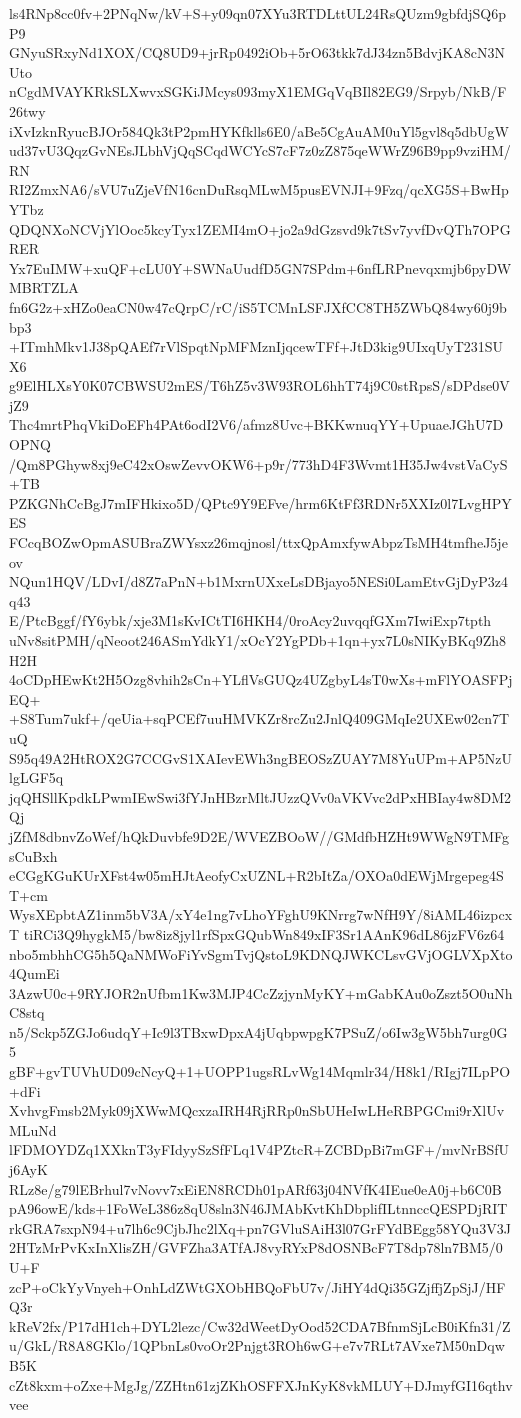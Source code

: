 ls4RNp8cc0fv+2PNqNw/kV+S+y09qn07XYu3RTDLttUL24RsQUzm9gbfdjSQ6pP9
GNyuSRxyNd1XOX/CQ8UD9+jrRp0492iOb+5rO63tkk7dJ34zn5BdvjKA8cN3NUto
nCgdMVAYKRkSLXwvxSGKiJMcys093myX1EMGqVqBIl82EG9/Srpyb/NkB/F26twy
iXvIzknRyucBJOr584Qk3tP2pmHYKfklls6E0/aBe5CgAuAM0uYl5gvl8q5dbUgW
ud37vU3QqzGvNEsJLbhVjQqSCqdWCYcS7cF7z0zZ875qeWWrZ96B9pp9vziHM/RN
RI2ZmxNA6/sVU7uZjeVfN16cnDuRsqMLwM5pusEVNJI+9Fzq/qcXG5S+BwHpYTbz
QDQNXoNCVjYlOoc5kcyTyx1ZEMI4mO+jo2a9dGzsvd9k7tSv7yvfDvQTh7OPGRER
Yx7EuIMW+xuQF+cLU0Y+SWNaUudfD5GN7SPdm+6nfLRPnevqxmjb6pyDWMBRTZLA
fn6G2z+xHZo0eaCN0w47cQrpC/rC/iS5TCMnLSFJXfCC8TH5ZWbQ84wy60j9bbp3
+ITmhMkv1J38pQAEf7rVlSpqtNpMFMznIjqcewTFf+JtD3kig9UIxqUyT231SUX6
g9ElHLXsY0K07CBWSU2mES/T6hZ5v3W93ROL6hhT74j9C0stRpsS/sDPdse0VjZ9
Thc4mrtPhqVkiDoEFh4PAt6odI2V6/afmz8Uvc+BKKwnuqYY+UpuaeJGhU7DOPNQ
/Qm8PGhyw8xj9eC42xOswZevvOKW6+p9r/773hD4F3Wvmt1H35Jw4vstVaCyS+TB
PZKGNhCcBgJ7mIFHkixo5D/QPtc9Y9EFve/hrm6KtFf3RDNr5XXIz0l7LvgHPYES
FCcqBOZwOpmASUBraZWYsxz26mqjnosl/ttxQpAmxfywAbpzTsMH4tmfheJ5jeov
NQun1HQV/LDvI/d8Z7aPnN+b1MxrnUXxeLsDBjayo5NESi0LamEtvGjDyP3z4q43
E/PtcBggf/fY6ybk/xje3M1sKvICtTI6HKH4/0roAcy2uvqqfGXm7IwiExp7tpth
uNv8sitPMH/qNeoot246ASmYdkY1/xOcY2YgPDb+1qn+yx7L0sNIKyBKq9Zh8H2H
4oCDpHEwKt2H5Ozg8vhih2sCn+YLflVsGUQz4UZgbyL4sT0wXs+mFlYOASFPjEQ+
+S8Tum7ukf+/qeUia+sqPCEf7uuHMVKZr8rcZu2JnlQ409GMqIe2UXEw02cn7TuQ
S95q49A2HtROX2G7CCGvS1XAIevEWh3ngBEOSzZUAY7M8YuUPm+AP5NzUlgLGF5q
jqQHSllKpdkLPwmIEwSwi3fYJnHBzrMltJUzzQVv0aVKVvc2dPxHBIay4w8DM2Qj
jZfM8dbnvZoWef/hQkDuvbfe9D2E/WVEZBOoW//GMdfbHZHt9WWgN9TMFgsCuBxh
eCGgKGuKUrXFst4w05mHJtAeofyCxUZNL+R2bItZa/OXOa0dEWjMrgepeg4ST+cm
WysXEpbtAZ1inm5bV3A/xY4e1ng7vLhoYFghU9KNrrg7wNfH9Y/8iAML46izpcxT
tiRCi3Q9hygkM5/bw8iz8jyl1rfSpxGQubWn849xIF3Sr1AAnK96dL86jzFV6z64
nbo5mbhhCG5h5QaNMWoFiYvSgmTvjQstoL9KDNQJWKCLsvGVjOGLVXpXto4QumEi
3AzwU0c+9RYJOR2nUfbm1Kw3MJP4CcZzjynMyKY+mGabKAu0oZszt5O0uNhC8stq
n5/Sckp5ZGJo6udqY+Ic9l3TBxwDpxA4jUqbpwpgK7PSuZ/o6Iw3gW5bh7urg0G5
gBF+gvTUVhUD09cNcyQ+1+UOPP1ugsRLvWg14Mqmlr34/H8k1/RIgj7ILpPO+dFi
XvhvgFmsb2Myk09jXWwMQcxzaIRH4RjRRp0nSbUHeIwLHeRBPGCmi9rXlUvMLuNd
lFDMOYDZq1XXknT3yFIdyySzSfFLq1V4PZtcR+ZCBDpBi7mGF+/mvNrBSfUj6AyK
RLz8e/g79lEBrhul7vNovv7xEiEN8RCDh01pARf63j04NVfK4IEue0eA0j+b6C0B
pA96owE/kds+1FoWeL386z8qU8sln3N46JMAbKvtKhDbplifILtnnccQESPDjRIT
rkGRA7sxpN94+u7lh6c9CjbJhc2lXq+pn7GVluSAiH3l07GrFYdBEgg58YQu3V3J
2HTzMrPvKxInXlisZH/GVFZha3ATfAJ8vyRYxP8dOSNBcF7T8dp78ln7BM5/0U+F
zcP+oCkYyVnyeh+OnhLdZWtGXObHBQoFbU7v/JiHY4dQi35GZjffjZpSjJ/HFQ3r
kReV2fx/P17dH1ch+DYL2lezc/Cw32dWeetDyOod52CDA7BfnmSjLcB0iKfn31/Z
u/GkL/R8A8GKlo/1QPbnLs0voOr2Pnjgt3ROh6wG+e7v7RLt7AVxe7M50nDqwB5K
cZt8kxm+oZxe+MgJg/ZZHtn61zjZKhOSFFXJnKyK8vkMLUY+DJmyfGI16qthvvee
